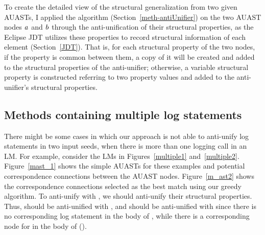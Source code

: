 To create the detailed view of the structural generalization from two given AUASTs, I applied the  algorithm (Section~\ref{meth-antiUnifier}) on the two AUAST nodes $\mathit{a}$ and $\mathit{b}$ through the anti-unification of their structural properties, as the Eclipse JDT utilizes these properties to record structural information of each  element (Section~\ref{JDT}). That is, for each structural property of the two nodes, if the property is common between them, a copy of it will be created and added to the structural properties of the anti-unifier; otherwise, a variable structural property is constructed referring to two property values and added to the anti-unifier's structural properties.






\subsection{Methods containing multiple log statements} \label{meth-multipleLogs}
There might be some cases in which our approach is not able to anti-unify log statements in two input seeds, when there is more than one logging call in an LM. For example, consider the LMs in Figures~\ref{multiple1} and~\ref{multiple2}. Figure~\ref{mast_1} shows the simple AUASTs for these examples and potential correspondence connections between the AUAST nodes. Figure~\ref{m_ast2} shows the correspondence connections selected as the best match using our greedy algorithm. To anti-unify  with , we should anti-unify their structural properties. Thus,  should be anti-unified with , and  should be anti-unified with \NIL{} since there is no corresponding log statement in the body of , while there is a corresponding node for  in the body of  ().

